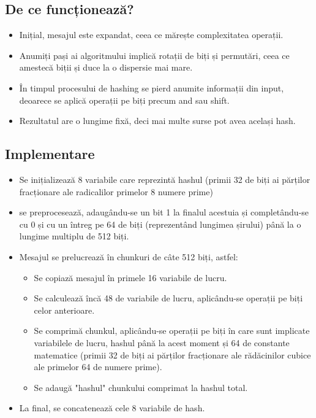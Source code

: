 \documentclass{article}
\begin{document}
\subsection{De ce funcționează?}
\begin{itemize}
      \item Inițial, mesajul este expandat, ceea ce mărește complexitatea operații.
      \item Anumiți pași ai algoritmului implică rotații de biți și permutări,
            ceea ce amestecă biții și duce la o dispersie mai mare.
      \item În timpul procesului de hashing se pierd anumite informații din input,
            deoarece se aplică operații pe biți precum and sau shift.
      \item Rezultatul are o lungime fixă, deci mai multe surse pot avea același hash.
\end{itemize}

\subsection{Implementare}
\begin{itemize}
      \item  Se inițializează 8 variabile care reprezintă hashul (primii 32 de
            biți ai părților fracționare ale radicalilor primelor 8 numere prime)

      \item se preprocesează, adaugându-se un bit 1 la finalul acestuia și
            completându-se cu 0 și cu un întreg pe 64 de biți (reprezentând
            lungimea șirului) până la o lungime multiplu de 512 biți.

      \item Mesajul se prelucrează în chunkuri de câte 512 biți, astfel:
            \begin{itemize}
                  \item Se copiază mesajul în primele 16 variabile de lucru.
                  \item Se calculează încă 48 de variabile de lucru, aplicându-se
                        operații pe biți celor anterioare.
                  \item Se comprimă chunkul, aplicându-se operații pe biți în care
                        sunt implicate variabilele de lucru, hashul până la acest
                        moment și 64 de constante matematice (primii 32 de biți ai
                        părților fracționare ale rădăcinilor cubice ale primelor 64
                        de numere prime).
                  \item Se adaugă "hashul" chunkului comprimat la hashul total.
            \end{itemize}

      \item La final, se concatenează cele 8 variabile de hash.
\end{itemize}
\end{document}
